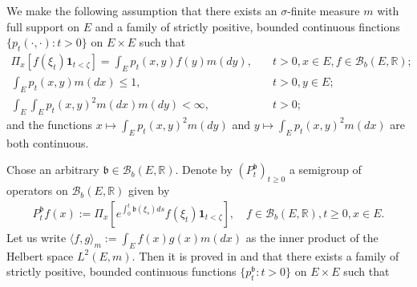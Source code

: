 \documentclass[12pt,a4paper]{amsart}
\numberwithin{equation}{section}
\theoremstyle{plain}
\theoremstyle{definition}
\theoremstyle{remark}
\newcounter{N}
\newcounter{n}[N]
\begin{document}
	We make the following assumption that there exists an $\sigma$-finite measure $m$ with full support on $E$ and a family of strictly positive, bounded continuous finctions $\{p_t(\cdot,\cdot): t>0\}$ on $E\times E$ such that 
\begin{align} 
	\Pi_x[f(\xi_t)\mathbf 1_{t< \zeta}] = \int_E p_t(x,y) f(y)m(dy), & \quad t>0, x\in E, f\in \mathcal B_b(E,\mathbb R);
	\\ \int_E p_t(x,y) m(dx) \leq 1, &\quad t>0, y\in E;
	\\ \int_E \int_E p_t(x,y)^2 m(dx)m(dy) < \infty, &\quad t>0; 
\end{align}
	and the functions $x \mapsto \int_E p_t(x,y)^2m(dy)$ and $y\mapsto \int_E p_t(x,y)^2m(dx)$ are both continuous.

Chose an arbitrary $ \mathfrak b\in \mathcal B_b(E,\mathbb R)$.
Denote by $(P_t^\mathfrak b)_{t\geq 0}$ a semigroup of operators on $\mathcal B_b(E,\mathbb R)$ given by
\begin{align} P_t^\mathfrak b f(x):= \Pi_x[e^{\int_0^t \mathfrak b(\xi_s)ds} f(\xi_t)\mathbf 1_{t< \zeta}],\quad f\in \mathcal B_b(E, \mathbb R), t\geq 0, x\in E. \end{align}
Let us write $\langle f,g \rangle_m:= \int_E f(x)g(x) m(dx)$ as the inner product of the Helbert space $L^2(E,m)$. 
Then it is proved in \cite{RenSongZhang2015Limit} and \cite{RenSongZhang2017Central} that there exists a family of strictly positive, bounded continuous functions $\{p_t^\mathfrak b: t> 0\}$ on $E\times E$ such that
\end{document}
